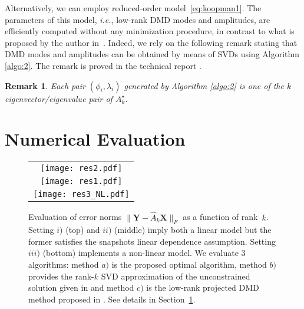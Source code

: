 \documentclass{article}
\newcommand{\Cr}{\mathds{C}}
\newcommand{\R}{P}
\newcommand{\AAA}{\mathbf{X}}
\newcommand{\BBB}{\mathbf{Y}}
\newcommand{\ie}{\textit{i.e.}, }
\newtheorem{remark}{Remark}
\begin{document}
Alternatively,  we can employ reduced-order model~\eqref{eq:koopman1}. The parameters of this model, \ie low-rank DMD modes and amplitudes, are efficiently computed without any minimization procedure, in contrast to what is proposed by the author in~{\cite{Jovanovic12}}. Indeed, we  rely on the following remark stating that  DMD modes and amplitudes can be obtained by means of SVDs using  Algorithm \ref{algo:2}. The remark is proved in  the  {technical report  \cite{Heas16_DMD}}.
 \begin{remark}\label{rem:2}
Each pair $(\phi_i,\lambda_i)$ generated by Algorithm \ref{algo:2}  is one of the $k$ eigenvector/eigenvalue pair of $A_k^\star$.
\end{remark}

\section{Numerical Evaluation}\label{sec:numEval}\vspace{-0.cm}
\begin{figure}[t!]
\centering\vspace{-3.95cm}
\begin{tabular}{c}
\texttt{[image: res2.pdf]}\vspace{-5.2cm}\\
\texttt{[image: res1.pdf]}\vspace{-5.2cm}\\
\texttt{[image: res3\_NL.pdf]}\vspace{-2.75cm}
\end{tabular}
\caption{\small Evaluation of error norms $\|\BBB-\hat A_k \AAA\|_F$   as a function of   rank~$k$.   Setting $i)$  {({top})} and $ii)$ (middle)  imply both a linear model but the former satisfies the snapshots linear dependence assumption. Setting $iii)$ {({bottom})} implements a non-linear model. We evaluate 3  algorithms:  {method $a)$} is the proposed optimal algorithm, {method $b)$} provides the rank-$k$ SVD approximation of the unconstrained solution given in \cite{Tu2014391} and {method $c)$} is the low-rank projected DMD method proposed in \cite{Jovanovic12}. See details in Section~\ref{sec:numEval}. \vspace{-0.3cm}\label{fig:1}}
\end{figure}
\end{document}
